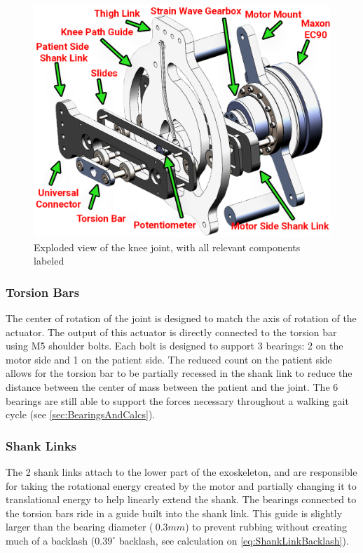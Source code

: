 \begin{figure} [ht!]
    \centering
    \includegraphics[width=0.8\linewidth]{Figures/Design/ExoKneeExplodedView.png}
    \caption{Exploded view of the knee joint, with all relevant components labeled}
    \label{fig:KneeJointExplodedView}
\end{figure}

\subsubsection{Torsion Bars}
The center of rotation of the joint is designed to match the axis of rotation of the actuator. The output of this actuator  is directly connected to the torsion bar using M5 shoulder bolts. Each bolt is designed to support 3 bearings: 2 on the motor side and 1 on the patient side. The reduced count on the patient side allows for the torsion bar to be partially recessed in the shank link to reduce the distance between the center of mass between the patient and the joint. The 6 bearings are still able to support the forces necessary throughout a walking gait cycle (see \autoref{sec:BearingsAndCalcs}). 

\subsubsection{Shank Links}
The 2 shank links attach to the lower part of the exoskeleton, and are responsible for taking the rotational energy created by the motor and partially changing it to translational energy to help linearly extend the shank. The bearings connected to the torsion bars ride in a guide built into the shank link. This guide is slightly larger than the bearing diameter (\(~0.3mm\)) to prevent rubbing without creating much of a backlash (\(0.39^\circ\) backlash, see calculation on \autoref{eq:ShankLinkBacklash}).

